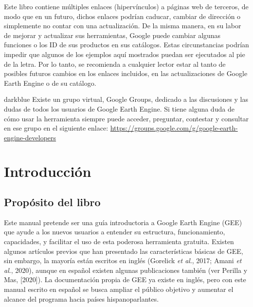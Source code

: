 \documentclass[
  12pt,
  letterpaper,
  twoside]{book}
\renewcommand\headrulewidth{0pt}
\begin{document}
Este libro contiene múltiples enlaces (hipervínculos) a páginas web de terceros, de modo que en un futuro, dichos enlaces podrían caducar, cambiar de dirección o simplemente no contar con una actualización. De la misma manera, en su labor de mejorar y actualizar sus herramientas, Google puede cambiar algunas funciones o los ID de sus productos en sus catálogos. Estas circunstancias podrían impedir que algunos de los ejemplos aquí mostrados puedan ser ejecutados al pie de la letra. Por lo tanto, se recomienda a cualquier lector estar al tanto de posibles futuros cambios en los enlaces incluidos, en las actualizaciones de Google Earth Engine o de su catálogo.

\begin{bluebox2}

\begin{awesomeblock}{5pt}{\faLightbulb}{darkblue}
Existe un grupo virtual, Google Groups, dedicado a las discusiones y las dudas de todos los usuarios de Google Earth Engine. Si tiene alguna duda de cómo usar la herramienta siempre puede acceder, preguntar, contestar y consultar en ese grupo en el siguiente enlace: \url{https://groups.google.com/g/google-earth-engine-developers}

\end{awesomeblock}

\end{bluebox2}

\newpage
\mainmatter

\renewcommand\headrulewidth{1pt}
\pagestyle{fancy} 
 \fancyfoot{}
 \fancyfoot[LE,RO]{\thepage}
 \fancyhead{}
 \fancyhead[LE,RO]{\leftmark}
 \fancyhead[LO,RE]{\rightmark}

\hypertarget{introducciuxf3n}{%
\chapter{Introducción}\label{introducciuxf3n}}

\hypertarget{propuxf3sito-del-libro}{%
\section{Propósito del libro}\label{propuxf3sito-del-libro}}

Este manual pretende ser una guía introductoria a Google Earth Engine (GEE) que ayude a los nuevos usuarios a entender su estructura, funcionamiento, capacidades, y facilitar el uso de esta poderosa herramienta gratuita. Existen algunos artículos previos que han presentado las características básicas de GEE, sin embargo, la mayoría están escritos en inglés (Gorelick \emph{et al}., 2017; Amani \emph{et al}., 2020), aunque en español existen algunas publicaciones también (ver Perilla y Mas, {[}2020{]}). La documentación propia de GEE ya existe en inglés, pero con este manual escrito en español se busca ampliar el público objetivo y aumentar el alcance del programa hacia países hispanoparlantes.
\end{document}
